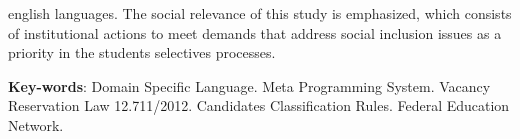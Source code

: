 \begin{resumo}[Abstract]
\begin{otherlanguage*}{english}
languages. The social relevance of this study is emphasized, which consists of institutional actions to meet demands that address social inclusion issues as a priority in the students selectives processes.



   \vspace{\onelineskip} 
 
   \noindent 
   \textbf{Key-words}: Domain Specific Language. Meta Programming System. Vacancy Reservation Law 12.711/2012. Candidates Classification Rules. Federal Education Network.
 \end{otherlanguage*}
 \end{resumo}
